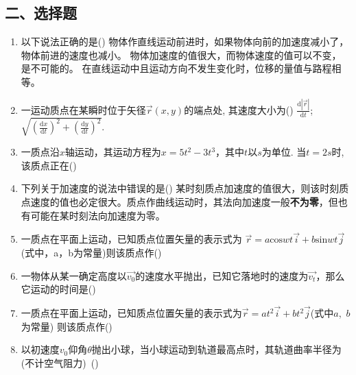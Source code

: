 \subsection*{二、选择题}
\begin{enumerate}
    \item 以下说法正确的是(\hspace{1pc})
    {物体作直线运动前进时，如果物体向前的加速度减小了，物体前进的速度也减小。}
    {物体加速度的值很大，而物体速度的值可以不变，是不可能的。}
    {在直线运动中且运动方向不发生变化时，位移的量值与路程相等。}
    \item 一运动质点在某瞬时位于矢径$\vec{r}(x,y)$的端点处, 其速度大小为(\hspace{1pc})
    {$\frac{\mathrm{d}|\vec{r}|}{\mathrm{d}t}$;}{$\sqrt{(\frac{\mathrm{d}x}{\mathrm{d}t})^2+(\frac{\mathrm{d}y}{\mathrm{d}t})^2}$.}
    \item 一质点沿$x$轴运动，其运动方程为$x=5t^2-3t^3$，其中$t$以$s$为单位. 当$t=2s$时, 该质点正在(\hspace{1pc})
    \item 下列关于加速度的说法中错误的是(\hspace{1pc})
    {某时刻质点加速度的值很大，则该时刻质点速度的值也必定很大。}{质点作曲线运动时，其法向加速度一般\textbf{不为零}，但也有可能在某时刻法向加速度为零。}
    \item 一质点在平面上运动，已知质点位置矢量的表示式为 $\vec{r}=a\mathrm{cos}wt\vec{i}+b\mathrm{sin}wt\vec{j}$(式中，a，b为常量)则该质点作(\hspace{1pt})
    \item 一物体从某一确定高度以$\vec{v_0}$的速度水平抛出，已知它落地时的速度为$\vec{v_t}$，那么它运动的时间是(\hspace{1pc})
    \item 一质点在平面上运动，已知质点位置矢量的表示式为$\vec{r}=at^2\vec{i}+bt^2\vec{j}$(式中$a$,\ $b$为常量) 则该质点作(\hspace{1pc})
    \item 以初速度$v_0$仰角$\theta$抛出小球，当小球运动到轨道最高点时，其轨道曲率半径为(不计空气阻力)\ (\hspace{1pc})

\end{enumerate}
